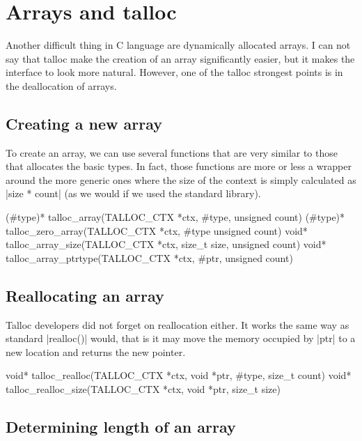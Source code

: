 \section{Arrays and talloc}
\label{talloc:sec:arrays}

Another difficult thing in C language are dynamically allocated arrays. I can
not say that talloc make the creation of an array significantly easier, but it
makes the interface to look more natural. However, one of the talloc strongest
points is in the deallocation of arrays.

\subsection{Creating a new array}

To create an array, we can use several functions that are very similar to those
that allocates the basic types. In fact, those functions are more or less a
wrapper around the more generic ones where the size of the context is simply
calculated as |size * count| (as we would if we used the standard library).

\begin{funcproto}
(#type)* talloc_array(TALLOC_CTX *ctx, #type,
                   unsigned count)
(#type)* talloc_zero_array(TALLOC_CTX *ctx, #type
                           unsigned count)
void* talloc_array_size(TALLOC_CTX *ctx, size_t size,
                        unsigned count)
void* talloc_array_ptrtype(TALLOC_CTX *ctx, #ptr,
                           unsigned count)
\end{funcproto}

\subsection{Reallocating an array}

Talloc developers did not forget on reallocation either. It works the same way
as standard |realloc()| would, that is it may move the memory occupied by |ptr|
to a new location and returns the new pointer.

\begin{funcproto}
void* talloc_realloc(TALLOC_CTX *ctx, void *ptr,
                     #type, size_t count)
void* talloc_realloc_size(TALLOC_CTX *ctx, void *ptr,
                          size_t size)
\end{funcproto}

\subsection{Determining length of an array}

